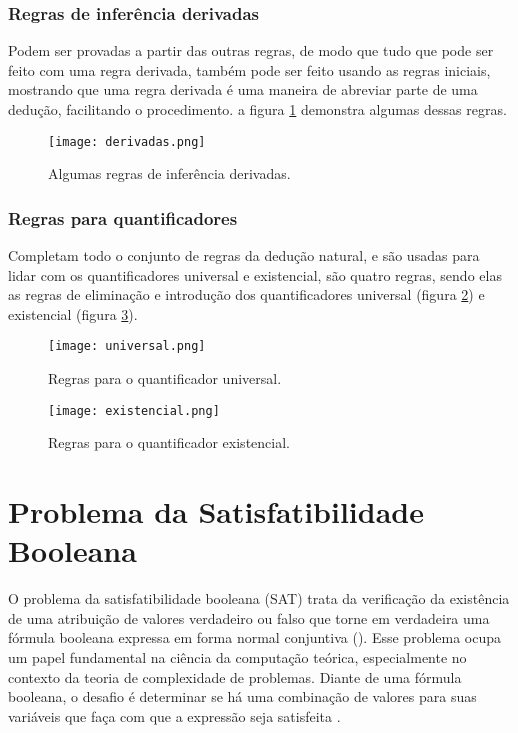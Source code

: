 \subsubsection{Regras de inferência derivadas}

Podem ser provadas a partir das outras regras, de modo que tudo que pode ser feito com uma regra derivada, também pode ser feito usando as regras iniciais, mostrando que uma regra derivada é uma maneira de abreviar parte de uma dedução, facilitando o procedimento. a figura \ref{fig:derivadas} demonstra algumas dessas regras.

\begin{figure}[!htb]
	\centering
	\caption[Algumas regras de inferência derivadas]{Algumas regras de inferência derivadas.}
	\texttt{[image: derivadas.png]}
	\label{fig:derivadas}
\end{figure}

\subsubsection{Regras para quantificadores}

Completam todo o conjunto de regras da dedução natural, e são usadas para lidar com os quantificadores universal e existencial, são quatro regras, sendo elas as regras de eliminação e introdução dos quantificadores universal (figura \ref{fig:universal}) e existencial (figura \ref{fig:existencial}).

\begin{figure}[!htb]
	\centering
	\caption[Regras para o quantificador universal]{Regras para o quantificador universal.}
	\texttt{[image: universal.png]}
	\label{fig:universal}
\end{figure}

\begin{figure}[!htb]
	\centering
	\caption[Regras para o quantificador existencial]{Regras para o quantificador existencial.}
	\texttt{[image: existencial.png]}
	\label{fig:existencial}
\end{figure}

\section{Problema da Satisfatibilidade Booleana}

O problema da satisfatibilidade booleana (SAT) trata da verificação da existência de uma atribuição de valores verdadeiro ou falso que torne em verdadeira uma fórmula booleana expressa em forma normal conjuntiva (). Esse problema ocupa um papel fundamental na ciência da computação teórica, especialmente no contexto da teoria de complexidade de problemas. Diante de uma fórmula booleana, o desafio é determinar se há uma combinação de valores para suas variáveis que faça com que a expressão seja satisfeita \cite{el2016computational}.

